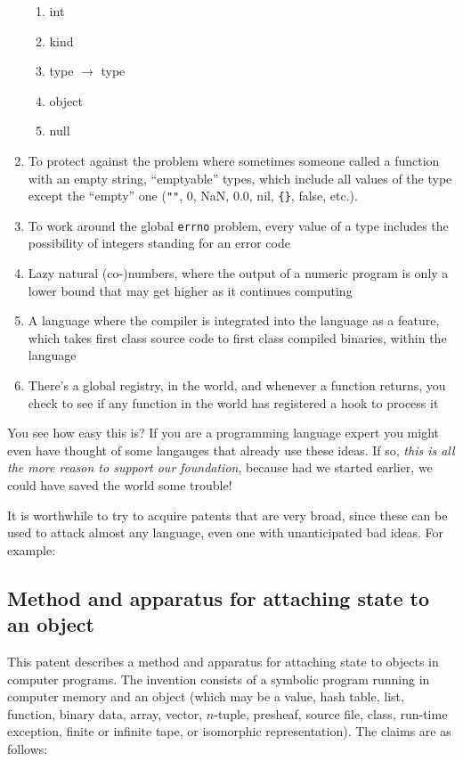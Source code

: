 \documentclass[acmtocl]%
{boviktrans}
\begin{document}
\begin{enumerate}
\begin{enumerate}
    \item int
    \item kind
    \item type $\rightarrow$ type
    \item object
    \item null
  \end{enumerate}
\item To protect against the problem where sometimes someone called a function with an empty string, ``emptyable'' types, which include all values of the type except the ``empty'' one (\verb+""+, 0, NaN, 0.0, nil, \verb+{}+, false, etc.).
\item To work around the global {\tt errno} problem, every value of a type includes the possibility of integers standing for an error code
\item Lazy natural (co-)numbers, where the output of a numeric program is only a lower bound that may get higher as it continues computing
\item A language where the compiler is integrated into the language as a feature, which takes first class source code to first class compiled binaries, within the language
\item There's a global registry, in the world, and whenever a function returns, you check to see if any function in the world has registered a hook to process it
\end{enumerate}

You see how easy this is? If you are a programming language expert you
might even have thought of some langauges that already use these
ideas. If so, {\it this is all the more reason to support our
  foundation}, because had we started earlier, we could have saved the
world some trouble!

It is worthwhile to try to acquire patents that are very broad, since
these can be used to attack almost any language, even one with
unanticipated bad ideas. For example:


\subsection{Method and apparatus for attaching state to an object}

This patent describes a method and apparatus for attaching state to
objects in computer programs. The invention consists of a symbolic
program running in computer memory and an object (which may be a value,
hash table, list, function, binary data, array, vector, $n$-tuple,
presheaf, source file, class, run-time exception, finite or infinite
tape, or isomorphic representation). The claims are as follows:
\end{document}

